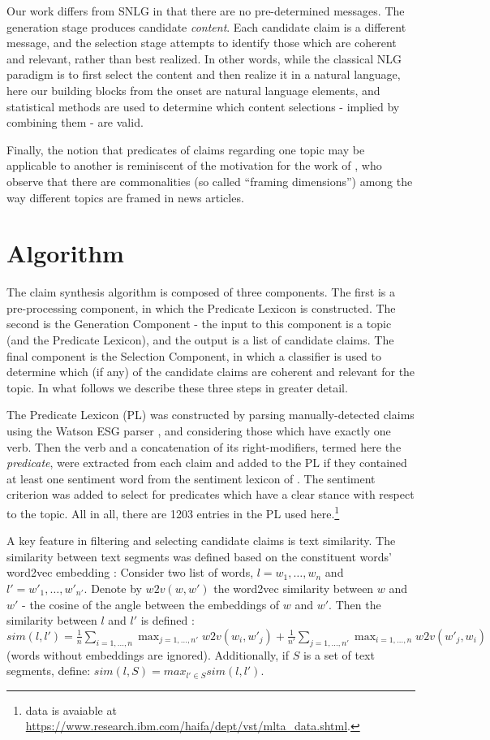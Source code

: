 \documentclass[11pt]{article}
\begin{document}
Our work differs from SNLG in that there are no %
pre-determined messages. The generation stage produces candidate \textit{content}. Each candidate claim is a different message, and the selection stage attempts to identify those which are coherent and relevant, rather than best realized. In other words, while the classical NLG paradigm is to first select the content and then realize it in a natural language, here our building blocks from the onset are natural language elements, and statistical methods are used to determine which content selections - implied by combining them - are valid.

Finally, the notion that predicates of claims regarding one topic may be applicable to another is reminiscent of the motivation for the work of \cite{Card15}, who observe that there are commonalities (so called ``framing dimensions'') among the way different topics are framed in news articles.

\section{Algorithm}
The claim synthesis algorithm is composed of three components. The first is a 
pre-processing component, 
in which the Predicate Lexicon is constructed. The second is the Generation Component - the input to this component is a topic (and the Predicate Lexicon), and the output is a list of candidate claims. The final component is the Selection Component, in which a classifier is used to determine which (if any) of the candidate claims are coherent and relevant for the topic. In what follows we describe these three steps in greater detail.

The Predicate Lexicon (PL) was constructed by parsing manually-detected claims \cite{debater} using the Watson ESG parser \cite{watson}, and considering those which have exactly one verb. Then the verb and a concatenation of its right-modifiers, 
termed here the {\it predicate\/}, %
were extracted from each claim and added to the PL if they contained at least one sentiment word from the sentiment lexicon of \cite{sentiment}. The sentiment criterion was added to select for predicates which have a clear stance with respect to the topic. All in all, there are 1203 entries in the PL used here.\footnote{data is avaiable at \url{https://www.research.ibm.com/haifa/dept/vst/mlta_data.shtml}.}

A key feature in filtering and selecting candidate claims is text similarity. The similarity between text segments was defined based on the constituent words' word2vec embedding \cite{w2v}: Consider two list of words, $l = w_1, \ldots, w_n$ and $l' = w'_1, \ldots, w'_{n'}$. Denote by $w2v(w,w')$ the word2vec similarity between $w$ and $w'$ - the cosine of the angle between the embeddings of $w$ and $w'$. Then the similarity between $l$ and $l'$ is defined :
$sim(l,l') =  \frac 1 n  \sum_{i=1,\ldots,n} \max_{j=1,\ldots,n'} w2v(w_i, w'_j)  +  
\frac 1 {n'}  \sum_{j=1,\ldots,n'} \max_{i=1,\ldots,n} w2v(w'_j, w_i) $ 
(words without embeddings are ignored). Additionally, if $S$ is a set of text segments, define: $sim(l,S) = max_{l' \in S} sim(l,l')$. 
\end{document}
